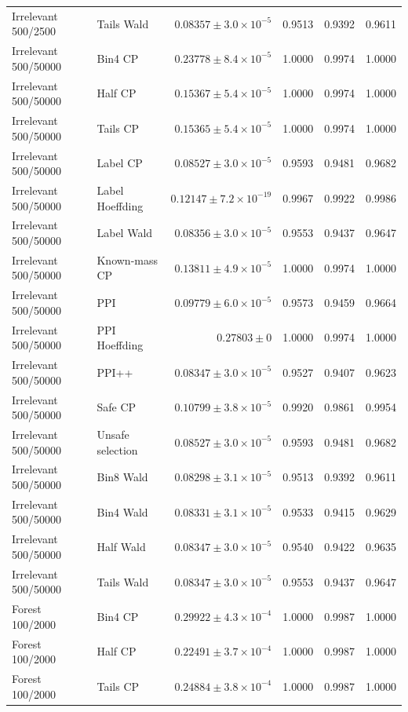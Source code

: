 \begin{longtable}{llrrrr}
Irrelevant 500/2500 & Tails Wald & $0.08357\pm 3.0\times 10^{-5}$ & 0.9513 & 0.9392 & 0.9611 \\
Irrelevant 500/50000 & Bin4 CP & $0.23778\pm 8.4\times 10^{-5}$ & 1.0000 & 0.9974 & 1.0000 \\
Irrelevant 500/50000 & Half CP & $0.15367\pm 5.4\times 10^{-5}$ & 1.0000 & 0.9974 & 1.0000 \\
Irrelevant 500/50000 & Tails CP & $0.15365\pm 5.4\times 10^{-5}$ & 1.0000 & 0.9974 & 1.0000 \\
Irrelevant 500/50000 & Label CP & $0.08527\pm 3.0\times 10^{-5}$ & 0.9593 & 0.9481 & 0.9682 \\
Irrelevant 500/50000 & Label Hoeffding & $0.12147\pm 7.2\times 10^{-19}$ & 0.9967 & 0.9922 & 0.9986 \\
Irrelevant 500/50000 & Label Wald & $0.08356\pm 3.0\times 10^{-5}$ & 0.9553 & 0.9437 & 0.9647 \\
Irrelevant 500/50000 & Known-mass CP & $0.13811\pm 4.9\times 10^{-5}$ & 1.0000 & 0.9974 & 1.0000 \\
Irrelevant 500/50000 & PPI & $0.09779\pm 6.0\times 10^{-5}$ & 0.9573 & 0.9459 & 0.9664 \\
Irrelevant 500/50000 & PPI Hoeffding & $0.27803\pm 0$ & 1.0000 & 0.9974 & 1.0000 \\
Irrelevant 500/50000 & PPI++ & $0.08347\pm 3.0\times 10^{-5}$ & 0.9527 & 0.9407 & 0.9623 \\
Irrelevant 500/50000 & Safe CP & $0.10799\pm 3.8\times 10^{-5}$ & 0.9920 & 0.9861 & 0.9954 \\
Irrelevant 500/50000 & Unsafe selection & $0.08527\pm 3.0\times 10^{-5}$ & 0.9593 & 0.9481 & 0.9682 \\
Irrelevant 500/50000 & Bin8 Wald & $0.08298\pm 3.1\times 10^{-5}$ & 0.9513 & 0.9392 & 0.9611 \\
Irrelevant 500/50000 & Bin4 Wald & $0.08331\pm 3.1\times 10^{-5}$ & 0.9533 & 0.9415 & 0.9629 \\
Irrelevant 500/50000 & Half Wald & $0.08347\pm 3.0\times 10^{-5}$ & 0.9540 & 0.9422 & 0.9635 \\
Irrelevant 500/50000 & Tails Wald & $0.08347\pm 3.0\times 10^{-5}$ & 0.9553 & 0.9437 & 0.9647 \\
Forest 100/2000 & Bin4 CP & $0.29922\pm 4.3\times 10^{-4}$ & 1.0000 & 0.9987 & 1.0000 \\
Forest 100/2000 & Half CP & $0.22491\pm 3.7\times 10^{-4}$ & 1.0000 & 0.9987 & 1.0000 \\
Forest 100/2000 & Tails CP & $0.24884\pm 3.8\times 10^{-4}$ & 1.0000 & 0.9987 & 1.0000 \\

\end{longtable}
